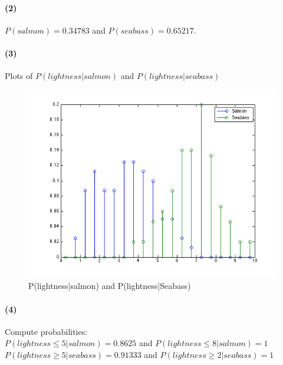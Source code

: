 \documentclass[a4paper]{article}
\begin{document}
%
%
\paragraph{(2) } $P(salmon) = 0.34783$ and $P(seabass) = 0.65217$.

%
%
\paragraph{(3) } Plots of $P(lightness|salmon)$ and $P(lightness|seabass)$ ~\\
\begin{figure}[h!]
  \centering
    \includegraphics[scale=.6]{images/conditional_probability_pmfs.png}
  \caption{P(lightness|salmon) and P(lightness|Seabass)}
\end{figure}

%
%
\paragraph{(4) } Compute probabilities: ~\\

$P(lightness\le5|salmon) = 0.8625$ and $P(lightness\le8|salmon) = 1$ \\

$P(lightness\ge5|seabass) = 0.91333$ and $P(lightness\ge2|seabass) = 1$

%
%
\end{document}
